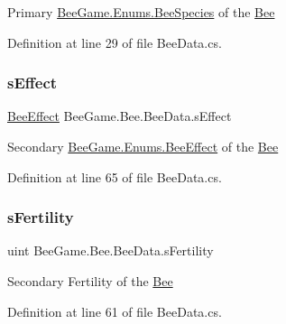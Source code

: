 Primary \hyperlink{namespace_bee_game_1_1_enums_aa2ead984825678d83c42d48f6382619c}{Bee\+Game.\+Enums.\+Bee\+Species} of the \hyperlink{namespace_bee_game_1_1_bee}{Bee} 



Definition at line 29 of file Bee\+Data.\+cs.

\mbox{\label{struct_bee_game_1_1_bee_1_1_bee_data_ac65b550d77e529a62cb60acf86502bc2}} 
\subsubsection{\texorpdfstring{s\+Effect}{sEffect}}
{\footnotesize\ttfamily \hyperlink{namespace_bee_game_1_1_enums_acf7ae32a86385a40fc0c7b55af95c6c3}{Bee\+Effect} Bee\+Game.\+Bee.\+Bee\+Data.\+s\+Effect}



Secondary \hyperlink{namespace_bee_game_1_1_enums_acf7ae32a86385a40fc0c7b55af95c6c3}{Bee\+Game.\+Enums.\+Bee\+Effect} of the \hyperlink{namespace_bee_game_1_1_bee}{Bee} 



Definition at line 65 of file Bee\+Data.\+cs.

\mbox{\label{struct_bee_game_1_1_bee_1_1_bee_data_a20a4084334bbbba3942f67622596b596}} 
\subsubsection{\texorpdfstring{s\+Fertility}{sFertility}}
{\footnotesize\ttfamily uint Bee\+Game.\+Bee.\+Bee\+Data.\+s\+Fertility}



Secondary Fertility of the \hyperlink{namespace_bee_game_1_1_bee}{Bee} 



Definition at line 61 of file Bee\+Data.\+cs.

\mbox{\label{struct_bee_game_1_1_bee_1_1_bee_data_af5c384db9813e463bb0d66cb8b443d87}} 
